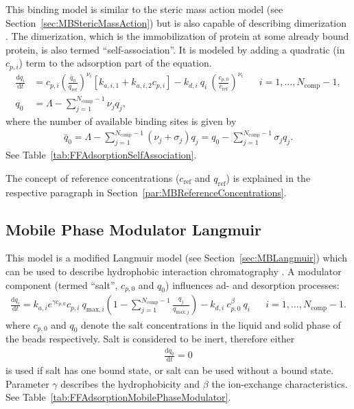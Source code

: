 This binding model is similar to the steric mass action model (see Section~\ref{sec:MBStericMassAction}) but is also capable of describing dimerization \cite{Mollerup2008,Westerberg2012}. 
The dimerization, which is the immobilization of protein at some already bound protein, is also termed ``self-association''.
It is modeled by adding a quadratic (in $c_{p,i}$) term to the adsorption part of the equation.
\begin{align*}
  \frac{\mathrm{d} q_i}{\mathrm{d} t} &= c_{p,i}\left( \frac{\bar{q}_0}{q_{\text{ref}}} \right)^{\nu_i} \left[ k_{a,i,1} + k_{a,i,2} c_{p,i} \right] - k_{d,i}\: q_i\: \left(\frac{c_{p,0}}{c_{\text{ref}}}\right)^{\nu_i} && i = 1, \dots, N_{\text{comp}} - 1, \\
  q_0 &= \Lambda - \sum_{j=1}^{N_{\text{comp}} - 1} \nu_j q_j,
\end{align*}
where the number of available binding sites is given by
\begin{align*}
  \bar{q}_0 = \Lambda - \sum_{j=1}^{N_{\text{comp}} - 1} \left( \nu_j + \sigma_j \right) q_j = q_0 - \sum_{j=1}^{N_{\text{comp}} - 1} \sigma_j q_j.
\end{align*}
See Table~\ref{tab:FFAdsorptionSelfAssociation}.

The concept of reference concentrations ($c_{\text{ref}}$ and $q_{\text{ref}}$) is explained in the respective paragraph in Section~\ref{par:MBReferenceConcentrations}.

\subsection{Mobile Phase Modulator Langmuir}

This model is a modified Langmuir model (see Section~\ref{sec:MBLangmuir}) which can be used to describe hydrophobic interaction chromatography \cite{Melander1989,Karlsson2004}. 
A modulator component (termed ``salt'', $c_{p,0}$ and $q_0$) influences ad- and desorption processes:
\begin{align*}
  \frac{\mathrm{d} q_i}{\mathrm{d} t} = k_{a,i} e^{\gamma c_{p,0}} c_{p,i}\: q_{\text{max},i} \left( 1 - \sum_{j=1}^{N_{\text{comp}} - 1} \frac{q_j}{q_{\text{max},j}} \right) - k_{d,i} \: c_{p,0}^\beta \: q_i && i = 1, \dots, N_{\text{comp}} - 1.
\end{align*}
where $c_{p,0}$ and $q_0$ denote the salt concentrations in the liquid and solid phase of the beads respectively. 
Salt is considered to be inert, therefore either
\begin{align*}
  \frac{\mathrm{d} q_0}{\mathrm{d} t} = 0
\end{align*}
is used if salt has one bound state, or salt can be used without a bound state.
Parameter $\gamma$ describes the hydrophobicity and $\beta$ the ion-exchange characteristics.
See Table~\ref{tab:FFAdsorptionMobilePhaseModulator}.

